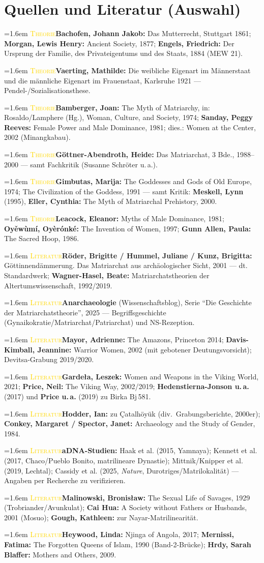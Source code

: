 \documentclass[11pt,a4paper,ngerman]{scrartcl}
\newcommand{\litentry}[2]{\par\noindent\hangindent=1.6em\hangafter=1
  {\footnotesize\scshape\textcolor{gold}{#1}}\quad #2\par\smallskip}
\begin{document}
\section{Quellen und Literatur (Auswahl)}
\litentry{Theorie}{\textbf{Bachofen, Johann Jakob:} Das Mutterrecht, Stuttgart 1861; \textbf{Morgan, Lewis Henry:} Ancient Society, 1877; \textbf{Engels, Friedrich:} Der Ursprung der Familie, des Privateigentums und des Staats, 1884 (MEW 21).}
\litentry{Theorie}{\textbf{Vaerting, Mathilde:} Die weibliche Eigenart im Männerstaat und die männliche Eigenart im Frauenstaat, Karlsruhe 1921 --- Pendel-/Sozialisationsthese.}
\litentry{Theorie}{\textbf{Bamberger, Joan:} The Myth of Matriarchy, in: Rosaldo/Lamphere (Hg.), Woman, Culture, and Society, 1974; \textbf{Sanday, Peggy Reeves:} Female Power and Male Dominance, 1981; dies.: Women at the Center, 2002 (Minangkabau).}
\litentry{Theorie}{\textbf{Göttner-Abendroth, Heide:} Das Matriarchat, 3 Bde., 1988--2000 --- samt Fachkritik (Susanne Schröter u.\,a.).}
\litentry{Theorie}{\textbf{Gimbutas, Marija:} The Goddesses and Gods of Old Europe, 1974; The Civilization of the Goddess, 1991 --- samt Kritik: \textbf{Meskell, Lynn} (1995), \textbf{Eller, Cynthia:} The Myth of Matriarchal Prehistory, 2000.}
\litentry{Theorie}{\textbf{Leacock, Eleanor:} Myths of Male Dominance, 1981; \textbf{Oyěwùmí, Oyèrónké:} The Invention of Women, 1997; \textbf{Gunn Allen, Paula:} The Sacred Hoop, 1986.}
\litentry{Literatur}{\textbf{Röder, Brigitte / Hummel, Juliane / Kunz, Brigitta:} Göttinnendämmerung. Das Matriarchat aus archäologischer Sicht, 2001 --- dt. Standardwerk; \textbf{Wagner-Hasel, Beate:} Matriarchatstheorien der Altertumswissenschaft, 1992/2019.}
\litentry{Literatur}{\textbf{Anarchaeologie} (Wissenschaftsblog), Serie \enquote{Die Geschichte der Matriarchatstheorie}, 2025 --- Begriffsgeschichte (Gynaikokratie/Matriarchat/Patriarchat) und NS-Rezeption.}
\litentry{Literatur}{\textbf{Mayor, Adrienne:} The Amazons, Princeton 2014; \textbf{Davis-Kimball, Jeannine:} Warrior Women, 2002 (mit gebotener Deutungsvorsicht); Devitsa-Grabung 2019/2020.}
\litentry{Literatur}{\textbf{Garde\l{}a, Leszek:} Women and Weapons in the Viking World, 2021; \textbf{Price, Neil:} The Viking Way, 2002/2019; \textbf{Hedenstierna-Jonson u.\,a.} (2017) und \textbf{Price u.\,a.} (2019) zu Birka Bj\,581.}
\litentry{Literatur}{\textbf{Hodder, Ian:} zu Çatalhöyük (div.\ Grabungsberichte, 2000er); \textbf{Conkey, Margaret / Spector, Janet:} Archaeology and the Study of Gender, 1984.}
\litentry{Literatur}{\textbf{aDNA-Studien:} Haak et al. (2015, Yamnaya); Kennett et al. (2017, Chaco/Pueblo Bonito, matrilineare Dynastie); Mittnik/Knipper et al. (2019, Lechtal); Cassidy et al. (2025, \emph{Nature}, Durotriges/Matrilokalität) --- Angaben per Recherche zu verifizieren.}
\litentry{Literatur}{\textbf{Malinowski, Bronis\l{}aw:} The Sexual Life of Savages, 1929 (Trobriander/Avunkulat); \textbf{Cai Hua:} A Society without Fathers or Husbands, 2001 (Mosuo); \textbf{Gough, Kathleen:} zur Nayar-Matrilinearität.}
\litentry{Literatur}{\textbf{Heywood, Linda:} Njinga of Angola, 2017; \textbf{Mernissi, Fatima:} The Forgotten Queens of Islam, 1990 (Band-2-Brücke); \textbf{Hrdy, Sarah Blaffer:} Mothers and Others, 2009.}
\end{document}
